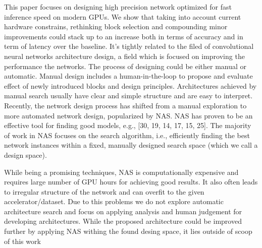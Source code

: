 This paper focuses on designing high precision network optimized for fast inference speed on modern GPUs. We show that taking into account current hardware constrains, rethinking block selection and compounding minor improvements could stack up to an increase both in terms of accuracy and in term of latency over the baseline. It's tightly related to the filed of convolutional neural networks architecture design, a field which is focused on improving the performance the networks. The process of designing could be either manual or automatic. Manual design includes a human-in-the-loop to propose and evaluate effect of newly introduced blocks and design principles. Architectures achieved by manual search usually have clear and simple structure and are easy to interpret. 
Recently, the network design process has shifted from a manual exploration to more automated network design, popularized by NAS. NAS has proven to be an effective tool for finding good models, e.g., [30, 19, 14, 17, 15, 25]. The majority of work in NAS focuses on the search algorithm, i.e., efficiently finding the best network instances within a fixed, manually designed search space (which we call a design space). 

While being a promising techniques, NAS is computationally expensive and requires large number of GPU hours for achieving good results. It also often leads to irregular structure of the network and can overfit to the given accelerator/dataset. Due to this problems we do not explore automatic architecture search and focus on applying analysis and human judgement for developing architectures. While the proposed architecture could be improved further by applying NAS withing the found desing space, it lies outside of scoop of this work




